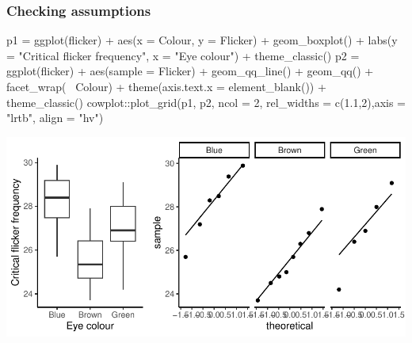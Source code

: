 \documentclass[a4paper]{article}
\begin{document}
\subsubsection{Checking assumptions}
\begin{Schunk}
\begin{Sinput}
p1 = ggplot(flicker) + aes(x = Colour, y = Flicker) + 
  geom_boxplot() + 
  labs(y = "Critical flicker frequency", x = "Eye colour") +
  theme_classic()
p2 = ggplot(flicker) + aes(sample = Flicker) + 
  geom_qq_line() + geom_qq() + facet_wrap(~ Colour) +
  theme(axis.text.x = element_blank()) +
  theme_classic()
cowplot::plot_grid(p1, p2, ncol = 2, rel_widths = c(1.1,2),axis = "lrtb", align = "hv")
\end{Sinput}


{\centering \includegraphics[width=\maxwidth]{figure/listings-unnamed-chunk-238-1} 

}

\end{Schunk}
\end{document}
